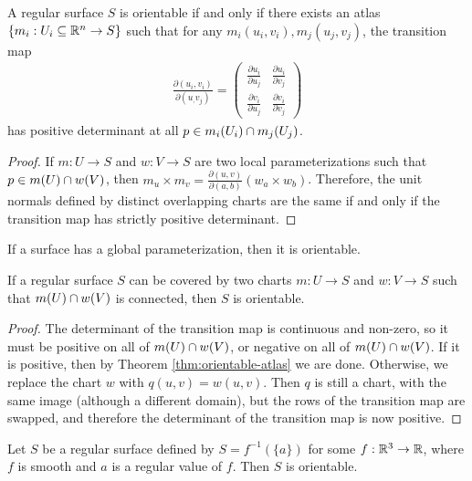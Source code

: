 \begin{thm}\label{thm:orientable-atlas}
    A regular surface $S$ is orientable if and only if there exists an atlas $\{m_i: U_i \subseteq \mathbb{R}^n \to S\}$ such that for any $m_i(u_i, v_i), m_j(u_j, v_j)$, the transition map
    \begin{align*}
        \frac{\partial (u_i, v_i)}{\partial (u_,v_j)} = \begin{pmatrix}
            \frac{\partial u_i}{\partial u_j} & \frac{\partial u_i}{\partial v_j} \\
            \frac{\partial v_i}{\partial u_j} & \frac{\partial v_i}{\partial v_j}
        \end{pmatrix}
    \end{align*}
    has positive determinant at all $p \in m_i(U_i) \cap m_j(U_j)$.
\end{thm}

\begin{proof}
    If $m: U \to S$ and $w: V \to S$ are two local parameterizations such that $p \in m(U) \cap w(V)$, then $m_u \times m_v = \frac{\partial (u,v)}{\partial (a, b)}(w_a \times w_b)$. Therefore, the unit normals defined by distinct overlapping charts are the same if and only if the transition map has strictly positive determinant.
\end{proof}

\begin{cor}
    If a surface has a global parameterization, then it is orientable.
\end{cor}

\begin{prop}
    If a regular surface $S$ can be covered by two charts $m: U \to S$ and $w: V \to S$ such that $m(U) \cap w(V)$ is connected, then $S$ is orientable.
\end{prop}

\begin{proof}
    The determinant of the transition map is continuous and non-zero, so it must be positive on all of $m(U) \cap w(V)$, or negative on all of $m(U) \cap w(V)$. If it is positive, then by Theorem \ref{thm:orientable-atlas} we are done. Otherwise, we replace the chart $w$ with $q(u, v) = w(u, v)$. Then $q$ is still a chart, with the same image (although a different domain), but the rows of the transition map are swapped, and therefore the determinant of the transition map is now positive.
\end{proof}

\begin{prop}
    Let $S$ be a regular surface defined by $S = f^{-1}(\{a\})$ for some $f: \mathbb{R}^3 \to \mathbb{R}$, where $f$ is smooth and $a$ is a regular value of $f$. Then $S$ is orientable.
\end{prop}

